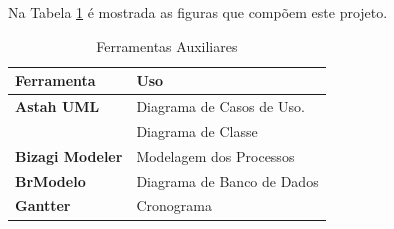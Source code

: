 Na Tabela \ref{tab:ferramentas_auxiliares} é mostrada as figuras que compõem este projeto.

\begin{table}[H]
	\begin{tabular}{|p{5.0cm}|p{10.0cm}|} 
	\hline
	\textbf{Ferramenta} & \textbf{Uso} \\ \hline
	\textbf{Astah UML} & Diagrama de Casos de Uso. \\ \hline
	& Diagrama de Classe \\ \hline
	\textbf{Bizagi Modeler} & Modelagem dos Processos \\ \hline
	\textbf{BrModelo} & Diagrama de Banco de Dados \\ \hline
	\textbf{Gantter} & Cronograma \\ \hline
	\end{tabular}
	 \caption{Ferramentas Auxiliares}
	 \label{tab:ferramentas_auxiliares}
\end{table}